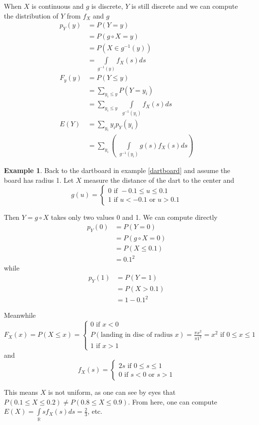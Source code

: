 \documentclass[12pt]{amsart}
\theoremstyle{definition}
\newtheorem{example}[theorem]{Example}
\begin{document}
When $X$ is continuous and $g$ is discrete, $Y$ is still discrete and we can compute the distribution of $Y$ from $f_X$ and $g$
\begin{align*}
p_Y(y) & = P(Y = y) \\
 & = P(g \circ X = y) \\
 & = P(X \in g^{-1}(y)) \\
 & = \int\limits_{g^{-1}(y)} f_X(s)ds \\
F_y(y) & = P(Y \leq y) \\
 & = \sum\limits_{y_i \leq y} P(Y = y_i) \\
 & = \sum\limits_{y_i \leq y} \,\, \int\limits_{g^{-1}(y_i)} f_X(s)ds \\
E(Y) & = \sum\limits_{y_i} y_ip_Y(y_i) \\
 & = \sum\limits_{y_i} \left( \,\, \int\limits_{g^{-1}(y_i)} g(s)f_X(s)ds \right)
\end{align*}

\begin{example} \label{dart_board_1} Back to the dartboard in example \ref{dartboard} and assume the board has radius 1. Let $X$ measure the distance of the dart to the center and
$$g(u) = \begin{cases} 0 \text{ if } -0.1 \leq u \leq 0.1 \\ 1 \text{ if } u < -0.1 \text{ or } u > 0.1 \end{cases}$$

Then $Y = g \circ X$ takes only two values 0 and 1. We can compute directly
\begin{align*}
p_Y(0) & = P(Y = 0) \\
 & = P(g \circ X = 0) \\
 & = P(X \leq 0.1) \\
 & = 0.1^2
\end{align*}
while
\begin{align*}
p_Y(1) & = P(Y = 1) \\
 & =  P(X > 0.1) \\
 & = 1 - 0.1^2
\end{align*}

Meanwhile
$$F_X(x) = P(X \leq x) = \begin{cases} 0 \text{ if } x < 0 \\ P (\text{landing in disc of radius } x) = \frac{\pi x^2}{\pi1^2} = x^2 \text{ if } 0 \leq x \leq 1 \\ 1 \text{ if } x > 1 \end{cases}$$
and
$$f_X(s) = \begin{cases} 2s \text{ if } 0 \leq s \leq 1 \\ 0 \text{ if } s < 0 \text{ or } s > 1 \end{cases}$$

This means $X$ is not uniform, as one can see by eyes that $P(0.1 \leq X \leq 0.2) \neq P(0.8 \leq X \leq 0.9)$. From here, one can compute $E(X) = \int\limits_{\mathbb{R}} s f_X(s)ds = \frac{2}{3}$, etc.
\end{example}
\end{document}
